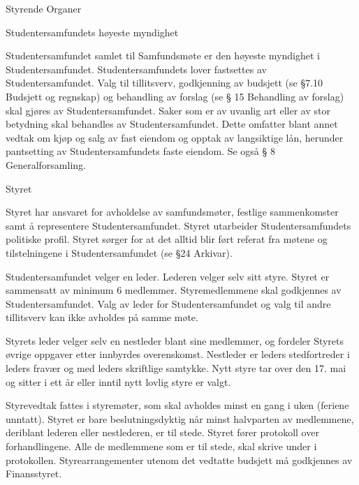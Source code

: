\begin{lovkapittel}{Styrende Organer}

  \begin{lovparagraf}{Studentersamfundets høyeste myndighet}
    
Studentersamfundet samlet til Samfundsmøte er den høyeste myndighet i Studentersamfundet. Studentersamfundets
lover fastsettes av Studentersamfundet. Valg til tillitsverv, godkjenning av budsjett (se §7.10 Budsjett og regnskap) og
behandling av forslag (se § 15 Behandling av forslag) skal gjøres av Studentersamfundet. Saker som er av uvanlig art
eller av stor betydning skal behandles av Studentersamfundet. Dette omfatter blant annet vedtak om kjøp og salg av
fast eiendom og opptak av langsiktige lån, herunder pantsetting av Studentersamfundets faste eiendom.
Se også § 8 Generalforsamling.

  \end{lovparagraf}
  
  \begin{lovparagraf}{Styret}
  
Styret har ansvaret for avholdelse av samfundsmøter, festlige sammenkomster samt å representere
Studentersamfundet. Styret utarbeider Studentersamfundets politiske profil. Styret sørger for at det alltid blir ført
referat fra møtene og tilstelningene i Studentersamfundet (se §24 Arkivar).

Studentersamfundet velger en leder. Lederen velger selv sitt styre. Styret er sammensatt av minimum 6 medlemmer.
Styremedlemmene skal godkjennes av Studentersamfundet. Valg av leder for Studentersamfundet og valg til andre
tillitsverv kan ikke avholdes på samme møte.

Styrets leder velger selv en nestleder blant sine medlemmer, og fordeler Styrets øvrige oppgaver etter innbyrdes
overenskomst. Nestleder er leders stedfortreder i leders fravær og med leders skriftlige samtykke. Nytt styre tar over
den 17. mai og sitter i ett år eller inntil nytt lovlig styre er valgt.

Styrevedtak fattes i styremøter, som skal avholdes minst en gang i uken (feriene unntatt). Styret er bare
beslutningsdyktig når minst halvparten av medlemmene, deriblant lederen eller nestlederen, er til stede. Styret fører
protokoll over forhandlingene. Alle de medlemmene som er til stede, skal skrive under i protokollen.
Styrearrangementer utenom det vedtatte budsjett må godkjennes av Finansstyret.

  \end{lovparagraf}


\end{lovkapittel}
